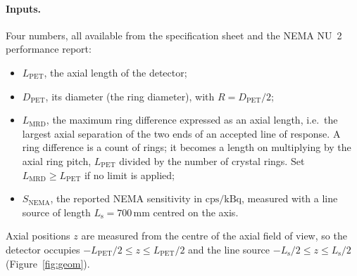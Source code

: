 \documentclass[11pt,a4paper]{article}
\newcommand{\Lpet}{L_{\mathrm{PET}}}
\newcommand{\Lsrc}{L_{\mathrm{s}}}
\newcommand{\Lmrd}{L_{\mathrm{MRD}}}
\newcommand{\Dpet}{D_{\mathrm{PET}}}
\newcommand{\Snema}{S_{\mathrm{NEMA}}}
\begin{document}
\paragraph{Inputs.} Four numbers, all available from the specification sheet and the NEMA
NU~2 performance report:
\begin{itemize}\setlength{\itemsep}{1pt}
  \item $\Lpet$, the axial length of the detector;
  \item $\Dpet$, its diameter (the ring diameter), with $R=\Dpet/2$;
  \item $\Lmrd$, the maximum ring difference expressed as an axial length, i.e.\ the largest
        axial separation of the two ends of an accepted line of response. A ring difference
        is a count of rings; it becomes a length on multiplying by the axial ring pitch,
        $\Lpet$ divided by the number of crystal rings. Set
        $\Lmrd\ge\Lpet$ if no limit is applied;
  \item $\Snema$, the reported NEMA sensitivity in $\mathrm{cps/kBq}$, measured with a line
        source of length $\Lsrc=700\,\mathrm{mm}$ centred on the axis.
\end{itemize}
Axial positions $z$ are measured from the centre of the axial field of view, so the detector
occupies $-\Lpet/2\le z\le\Lpet/2$ and the line source $-\Lsrc/2\le z\le\Lsrc/2$
(Figure~\ref{fig:geom}).
\end{document}

